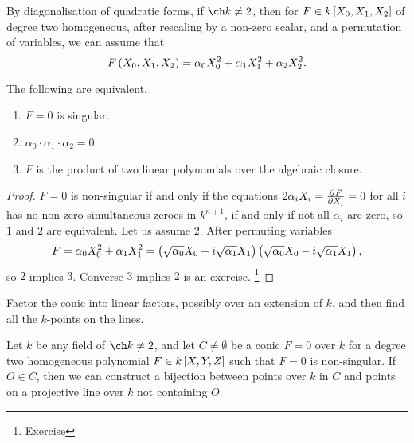 By diagonalisation of quadratic forms, if $ \ch k \ne 2 $, then for $ F \in k\sbr{X_0, X_1, X_2} $ of degree two homogeneous, after rescaling by a non-zero scalar, and a permutation of variables, we can assume that
$$ F\br{X_0, X_1, X_2} = \alpha_0X_0^2 + \alpha_1X_1^2 + \alpha_2X_2^2. $$

\begin{theorem}
The following are equivalent.
\begin{enumerate}
\item $ F = 0 $ is singular.
\item $ \alpha_0 \cdot \alpha_1 \cdot \alpha_2 = 0 $.
\item $ F $ is the product of two linear polynomials over the algebraic closure.
\end{enumerate}
\end{theorem}

\begin{proof}
$ F = 0 $ is non-singular if and only if the equations $ 2\alpha_iX_i = \tpd{F}{X_i} = 0 $ for all $ i $ has no non-zero simultaneous zeroes in $ k^{n + 1} $, if and only if not all $ \alpha_i $ are zero, so $ 1 $ and $ 2 $ are equivalent. Let us assume $ 2 $. After permuting variables
$$ F = \alpha_0X_0^2 + \alpha_1X_1^2 = \br{\sqrt{\alpha_0}X_0 + i\sqrt{\alpha_1}X_1}\br{\sqrt{\alpha_0}X_0 - i\sqrt{\alpha_1}X_1}, $$
so $ 2 $ implies $ 3 $. Converse $ 3 $ implies $ 2 $ is an exercise. \footnote{Exercise}
\end{proof}

\begin{algorithm}
Factor the conic into linear factors, possibly over an extension of $ k $, and then find all the $ k $-points on the lines.
\end{algorithm}


\begin{algorithm}
Let $ k $ be any field of $ \ch k \ne 2 $, and let $ C \ne \emptyset $ be a conic $ F = 0 $ over $ k $ for a degree two homogeneous polynomial $ F \in k\sbr{X, Y, Z} $ such that $ F = 0 $ is non-singular. If $ O \in C $, then we can construct a bijection between points over $ k $ in $ C $ and points on a projective line over $ k $ not containing $ O $.
\end{algorithm}

